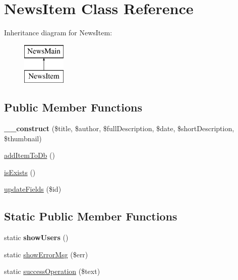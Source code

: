 \hypertarget{class_news_item}{}\section{News\+Item Class Reference}
\label{class_news_item}
Inheritance diagram for News\+Item\+:\begin{figure}[H]
\begin{center}
\leavevmode
\includegraphics[height=2.000000cm]{class_news_item}
\end{center}
\end{figure}
\subsection*{Public Member Functions}
\begin{DoxyCompactItemize}
\item 
\hypertarget{class_news_item_a9fa47254b85670cc01bf9d968c5064e3}{}{\bfseries \+\_\+\+\_\+construct} (\$title, \$author, \$full\+Description, \$date, \$short\+Description, \$thumbnail)\label{class_news_item_a9fa47254b85670cc01bf9d968c5064e3}

\item 
\hyperlink{class_news_item_aad600c9a2023020967610d3492a6c0e0}{add\+Item\+To\+Db} ()
\item 
\hyperlink{class_news_item_aed844dd8a243f1cfa782c176992a44d8}{is\+Exists} ()
\item 
\hyperlink{class_news_item_a19d08bdfd19c90288ad30800cf2789f1}{update\+Fields} (\$id)
\end{DoxyCompactItemize}
\subsection*{Static Public Member Functions}
\begin{DoxyCompactItemize}
\item 
\hypertarget{class_news_item_a25716637104ae8995d06d6c3dd89f10a}{}static {\bfseries show\+Users} ()\label{class_news_item_a25716637104ae8995d06d6c3dd89f10a}

\item 
static \hyperlink{class_news_item_a09b7b0d3e12a58217c4ce3ff9471057d}{show\+Error\+Msg} (\$err)
\item 
static \hyperlink{class_news_item_a8cc0f8e305092738dd124bb746383bcd}{success\+Operation} (\$text)
\end{DoxyCompactItemize}
